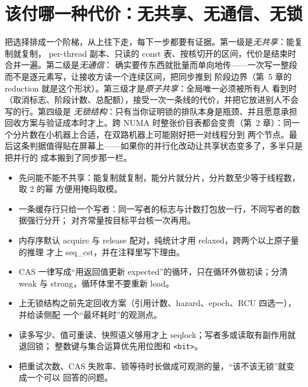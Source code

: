 \documentclass[12pt,a4paper,fontset=fandol]{ctexbook}
\newcommand{\Tp}[1]{\texttt{#1}}
\begin{document}
\section{该付哪一种代价：无共享、无通信、无锁}

把选择排成一个阶梯，从上往下走，每下一步都要有证据。第一级是\emph{无共享}：能复制就复制，
per-thread 副本、只读的 const 表、按核切开的区间，代价是结束时合并一遍。第二级是\emph{无通信}：
确实要传东西就批量而单向地传——一次写一整段而不是逐元素写，让接收方读一个连续区间，把同步推到
阶段边界（第~5 章的 reduction 就是这个形状）。第三级才是\emph{原子共享}：全局唯一必须被所有人
看到时（取消标志、阶段计数、总配额），接受一次一条线的代价，并把它放进别人不会写的行。第四级是
\emph{无锁结构}：只有当你证明锁的排队本身是瓶颈、并且愿意承担回收方案与验证成本时才上。跨 NUMA
时整张价目表都会变贵（第~2 章）：同一个分片数在小机器上合适，在双路机器上可能刚好把一对线程分到
两个节点。最后这条判据值得贴在屏幕上——如果你的并行化改动让共享状态变多了，多半只是把并行的
成本搬到了同步那一栏。

\begin{bestpractice}[title={共享状态的落地清单}]
\begin{itemize}
  \item 先问能不能不共享：能复制就复制，能分片就分片，分片数至少等于线程数，取 2 的幂
        方便用掩码取模。
  \item 一条缓存行只给一个写者：同一写者的标志与计数打包放一行，不同写者的数据强行分开；
        对齐常量按目标平台核一次再用。
  \item 内存序默认 acquire 与 release 配对，纯统计才用 relaxed，跨两个以上原子量的推理
        才上 seq\_cst，并在注释里写下理由。
  \item CAS 一律写成``用返回值更新 expected''的循环，只在循环外做初读；分清 weak 与
        strong，循环体里不要重新 load。
  \item 上无锁结构之前先定回收方案（引用计数、hazard、epoch、RCU 四选一），并给读侧配
        一个``最坏耗时''的观测点。
  \item 读多写少、值可重读、快照语义够用才上 seqlock；写者多或读取有副作用就退回锁；
        整数键与集合运算优先用位图和 \Tp{<bit>}。
  \item 把重试次数、CAS 失败率、锁等待时长做成可观测的量，``该不该无锁''就变成一个可以
        回答的问题。
\end{itemize}
\end{bestpractice}
\end{document}
